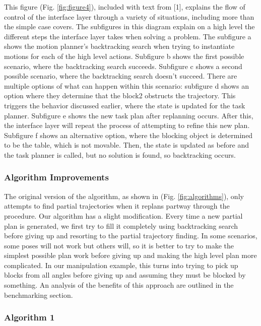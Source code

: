 \documentclass[12pt]{article}
\begin{document}
This figure (Fig. \ref{fig:figure4}), included with text from [1], explains the flow of control of the interface layer through a variety of situations, including more than the simple case covers.  
The subfigures in this diagram explain on a high level the different steps the interface layer takes when solving a problem.  
The subfigure a shows the motion planner's backtracking search when trying to instantiate motions for each of the high level actions.  
Subfigure b shows the first possible scenario, where the backtracking search succeeds.  Subfigure c shows a second possible scenario, where the backtracking search doesn't succeed.  
There are multiple options of what can happen within this scenario: subfigure d shows an option where they determine that the block2 obstructs the trajectory.  
This triggers the behavior discussed earlier, where the state is updated for the task planner.  
Subfigure e shows the new task plan after replanning occurs.  
After this, the interface layer will repeat the process of attempting to refine this new plan.  
Subfigure f shows an alternative option, where the blocking object is determined to be the table, which is not movable.  
Then, the state is updated as before and the task planner is called, but no solution is found, so backtracking occurs.

\subsubsection{Algorithm Improvements}

The original version of the algorithm, as shown in (Fig. \ref{fig:algorithms}), only attempts to find partial trajectories when it replans partway through the procedure.  Our algorithm has a slight modification. Every time a new partial plan is generated, we first try to fill it completely using backtracking search before giving up and resorting to the partial trajectory finding.  In some scenarios, some poses will not work but others will, so it is better to try to make the simplest possible plan work before giving up and making the high level plan more complicated.  In our manipulation example, this turns into trying to pick up blocks from all angles before giving up and assuming they must be blocked by something.  An analysis of the benefits of this approach are outlined in the benchmarking section.  

\subsubsection{Algorithm 1}
\end{document}
